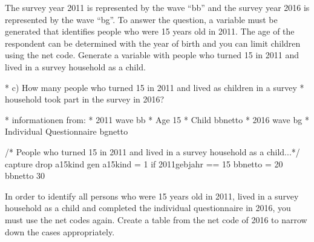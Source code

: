 \documentclass[letterpaper,10pt,openany,onesideH,english]{sphinxmanual}
\begin{document}

The survey year 2011 is represented by the wave “bb” and the survey year 2016 is represented by the wave “bg”. To answer the question, a variable must be generated that identifies people who were 15 years old in 2011. The age of the respondent can be determined with the year of birth and you can limit children using the net code. Generate a variable with people who turned 15 in 2011 and lived in a survey household as a child.

%
\begin{sphinxVerbatim}[commandchars=\\\{\},numbers=left,firstnumber=1,stepnumber=1]
* c) How many people who turned 15 in 2011 and lived as children in a survey 
*    household took part in the survey in 2016?

*   informationen from:
*  	2011 \PYGZhy{}\PYGZgt{} wave bb
*	Age  \PYGZhy{}\PYGZgt{} 15  
*	Child \PYGZhy{}\PYGZgt{} bbnetto   
*	2016 \PYGZhy{}\PYGZgt{} wave bg
* 	Individual Questionnaire \PYGZhy{}\PYGZgt{} bgnetto

/* People who turned 15 in 2011 and lived in a survey household as a child...*/
capture drop a15kind
gen a15kind = 1 if 2011\PYGZhy{}gebjahr == 15 \PYGZam{} bbnetto \PYGZgt{}= 20 \PYGZam{} bbnetto \PYGZlt{} 30

\end{sphinxVerbatim}

In order to identify all persons who were 15 years old in 2011, lived in a survey household as a child and completed the individual questionnaire in 2016, you must use the net codes again. Create a table from the net code of 2016 to narrow down the cases appropriately.

%
\begin{sphinxVerbatim}[commandchars=\\\{\},numbers=left,firstnumber=1,stepnumber=1]
              
 
             

\end{sphinxVerbatim}
\end{document}
